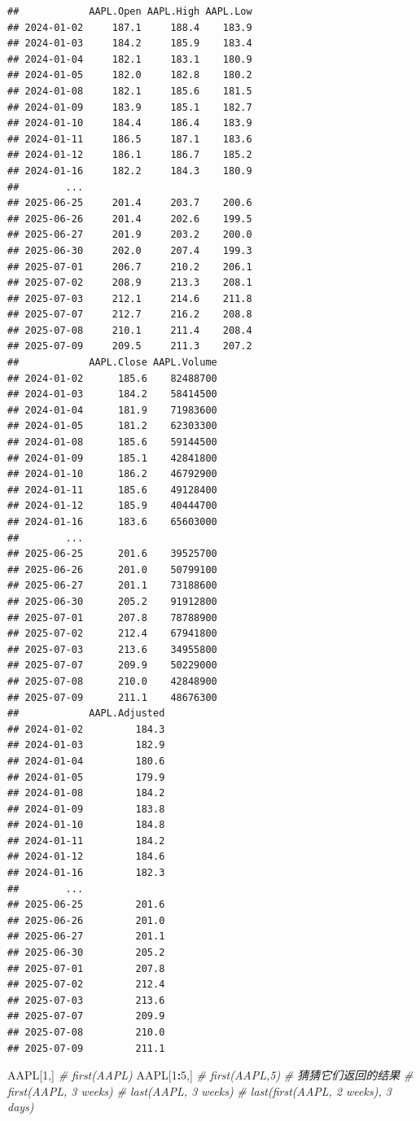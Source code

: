 \documentclass[]{ctexbook}
\newenvironment{Shaded}{\begin{snugshade}}{\end{snugshade}}
\newcommand{\CommentTok}[1]{\textcolor[rgb]{0.56,0.35,0.01}{\textit{#1}}}
\newcommand{\DecValTok}[1]{\textcolor[rgb]{0.00,0.00,0.81}{#1}}
\newcommand{\NormalTok}[1]{#1}
\newcommand{\SpecialCharTok}[1]{\textcolor[rgb]{0.81,0.36,0.00}{\textbf{#1}}}
\begin{document}
\begin{verbatim}
##            AAPL.Open AAPL.High AAPL.Low
## 2024-01-02     187.1     188.4    183.9
## 2024-01-03     184.2     185.9    183.4
## 2024-01-04     182.1     183.1    180.9
## 2024-01-05     182.0     182.8    180.2
## 2024-01-08     182.1     185.6    181.5
## 2024-01-09     183.9     185.1    182.7
## 2024-01-10     184.4     186.4    183.9
## 2024-01-11     186.5     187.1    183.6
## 2024-01-12     186.1     186.7    185.2
## 2024-01-16     182.2     184.3    180.9
##        ...                             
## 2025-06-25     201.4     203.7    200.6
## 2025-06-26     201.4     202.6    199.5
## 2025-06-27     201.9     203.2    200.0
## 2025-06-30     202.0     207.4    199.3
## 2025-07-01     206.7     210.2    206.1
## 2025-07-02     208.9     213.3    208.1
## 2025-07-03     212.1     214.6    211.8
## 2025-07-07     212.7     216.2    208.8
## 2025-07-08     210.1     211.4    208.4
## 2025-07-09     209.5     211.3    207.2
##            AAPL.Close AAPL.Volume
## 2024-01-02      185.6    82488700
## 2024-01-03      184.2    58414500
## 2024-01-04      181.9    71983600
## 2024-01-05      181.2    62303300
## 2024-01-08      185.6    59144500
## 2024-01-09      185.1    42841800
## 2024-01-10      186.2    46792900
## 2024-01-11      185.6    49128400
## 2024-01-12      185.9    40444700
## 2024-01-16      183.6    65603000
##        ...                       
## 2025-06-25      201.6    39525700
## 2025-06-26      201.0    50799100
## 2025-06-27      201.1    73188600
## 2025-06-30      205.2    91912800
## 2025-07-01      207.8    78788900
## 2025-07-02      212.4    67941800
## 2025-07-03      213.6    34955800
## 2025-07-07      209.9    50229000
## 2025-07-08      210.0    42848900
## 2025-07-09      211.1    48676300
##            AAPL.Adjusted
## 2024-01-02         184.3
## 2024-01-03         182.9
## 2024-01-04         180.6
## 2024-01-05         179.9
## 2024-01-08         184.2
## 2024-01-09         183.8
## 2024-01-10         184.8
## 2024-01-11         184.2
## 2024-01-12         184.6
## 2024-01-16         182.3
##        ...              
## 2025-06-25         201.6
## 2025-06-26         201.0
## 2025-06-27         201.1
## 2025-06-30         205.2
## 2025-07-01         207.8
## 2025-07-02         212.4
## 2025-07-03         213.6
## 2025-07-07         209.9
## 2025-07-08         210.0
## 2025-07-09         211.1
\end{verbatim}

\begin{Shaded}
\begin{Highlighting}[]
\NormalTok{AAPL[}\DecValTok{1}\NormalTok{,]}
\CommentTok{\# first(AAPL)}
\NormalTok{AAPL[}\DecValTok{1}\SpecialCharTok{:}\DecValTok{5}\NormalTok{,]}
\CommentTok{\# first(AAPL,5)}
\CommentTok{\# 猜猜它们返回的结果}
\CommentTok{\# first(AAPL, \textquotesingle{}3 weeks\textquotesingle{})}
\CommentTok{\# last(AAPL, \textquotesingle{}{-}3 weeks\textquotesingle{})}
\CommentTok{\# last(first(AAPL, \textquotesingle{}2 weeks\textquotesingle{}), \textquotesingle{}3 days\textquotesingle{})}
\end{Highlighting}
\end{Shaded}
\end{document}
